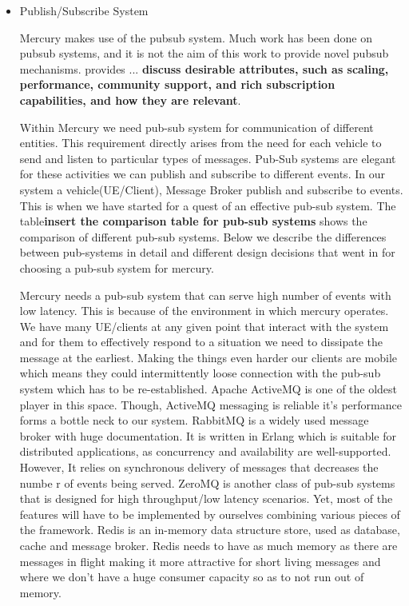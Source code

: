 \begin{itemize}

\item Publish/Subscribe System

Mercury makes use of the \pubsub pubsub system. Much work has been
done on pubsub systems, and it is not the aim of this work to provide
novel pubsub mechanisms. \pubsub provides ... {\bf discuss desirable
  attributes, such as scaling, performance, community support, and
  rich subscription capabilities, and how they are relevant}.

Within Mercury we need pub-sub system for communication of different entities. 
This requirement directly arises from the need for each vehicle to send and 
listen to particular types of messages. Pub-Sub systems are elegant for these 
activities we can publish and subscribe to different events. In our system a 
vehicle(UE/Client), Message Broker publish and subscribe to events. This is when
we have started for a quest of an effective pub-sub system. The table{\bf insert
the comparison table for pub-sub systems} shows the comparison of different 
pub-sub systems. Below we describe the differences between pub-systems in detail
and different design decisions that went in for choosing a pub-sub system for
mercury.
 
Mercury needs a pub-sub system that can serve high number of events with low 
latency. This is because of the environment in which mercury operates. 
We have many UE/clients at any given point that interact with the system and for
them to effectively respond to a situation we need to dissipate the message at 
the earliest. Making the things even harder our clients are mobile which means 
they could intermittently loose connection with the pub-sub system which has to
be re-established. Apache ActiveMQ\cite{activemq} is one of the oldest player
in this space. Though, ActiveMQ messaging is reliable it's performance forms a
bottle neck to our system. RabbitMQ\cite{rabbitmq} is a widely used message 
broker with huge documentation. It is written in Erlang which is suitable for 
distributed applications, as concurrency and availability are well-supported.
However, It relies on synchronous delivery of messages that decreases the numbe
r of events being served. ZeroMQ\cite{zeromq} is another class of pub-sub 
systems that is designed for high throughput/low latency scenarios. 
Yet, most of the features will have to be implemented by ourselves combining 
various pieces of the framework. Redis is an in-memory data structure store, 
used as database, cache and message broker. Redis needs to have as much memory 
as there are messages in flight making it more attractive for short living 
messages and where we don't have a huge consumer capacity so as to not run out 
of memory.


\end{itemize}
